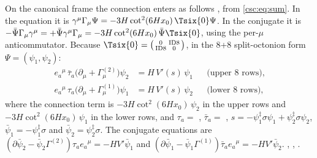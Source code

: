 On the canonical frame the connection enters as follows \cfderived, from \eqref{csc:eq:sum}. In
the equation it is $\gamma^\mu\Gamma_\mu\Psi=-3H\cot^2(6Hx_0)\,\Tsix{0}\Psi$. In the conjugate it is
$-\bar\Psi\Gamma_\mu\gamma^\mu=+\bar\Psi\gamma^\mu\Gamma_\mu=-3H\cot^2(6Hx_0)\,\bar\Psi\Tsix{0}$,
using the per-$\mu$ anticommutator. Because
$\Tsix{0}=\bigl(\begin{smallmatrix}0&\mathrm{ID8}\\ \mathrm{ID8}&0\end{smallmatrix}\bigr)$, in the 8+8
split-octonion form $\Psi=(\psi_1,\psi_2)$:
\begin{align}
  e_a{}^\mu\,\bar\tau_a\bigl(\partial_\mu+\Gamma^{(2)}_\mu\bigr)\psi_2&=H\,V'(s)\,\psi_1
    &&\text{(upper 8 rows)},\\
  e_a{}^\mu\,\tau_a\bigl(\partial_\mu+\Gamma^{(1)}_\mu\bigr)\psi_1&=H\,V'(s)\,\psi_2
    &&\text{(lower 8 rows)},
\end{align}
where the connection term is $-3H\cot^2(6Hx_0)\,\psi_2$ in the upper rows and
$-3H\cot^2(6Hx_0)\,\psi_1$ in the lower rows, and $\tau_a=$ , $\bar\tau_a=$ ,
$s=-\psi_1^\ddagger\sigma\psi_1+\psi_2^\ddagger\sigma\psi_2$, $\bar\psi_1=-\psi_1^\ddagger\sigma$
and $\bar\psi_2=\psi_2^\ddagger\sigma$. The conjugate equations are
$(\partial\bar\psi_2-\bar\psi_2\Gamma^{(2)})\tau_a e_a{}^\mu=-HV'\bar\psi_1$ and
$(\partial\bar\psi_1-\bar\psi_1\Gamma^{(1)})\bar\tau_a e_a{}^\mu=-HV'\bar\psi_2$.
 , , .

